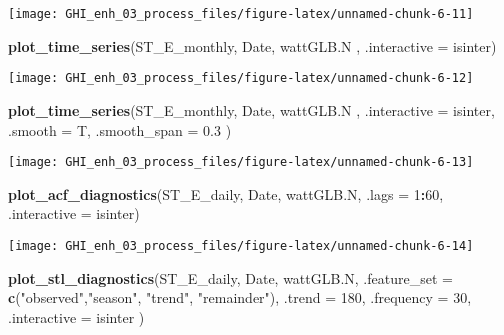 \documentclass[
  10pt,
  a4paper,oneside]{article}
\newenvironment{Shaded}{\begin{snugshade}}{\end{snugshade}}
\newcommand{\AttributeTok}[1]{\textcolor[rgb]{0.13,0.29,0.53}{#1}}
\newcommand{\DecValTok}[1]{\textcolor[rgb]{0.00,0.00,0.81}{#1}}
\newcommand{\FloatTok}[1]{\textcolor[rgb]{0.00,0.00,0.81}{#1}}
\newcommand{\FunctionTok}[1]{\textcolor[rgb]{0.13,0.29,0.53}{\textbf{#1}}}
\newcommand{\NormalTok}[1]{#1}
\newcommand{\SpecialCharTok}[1]{\textcolor[rgb]{0.81,0.36,0.00}{\textbf{#1}}}
\newcommand{\StringTok}[1]{\textcolor[rgb]{0.31,0.60,0.02}{#1}}
\begin{document}
\begin{center}\texttt{[image: GHI\_enh\_03\_process\_files/figure-latex/unnamed-chunk-6-11]} \end{center}

\begin{Shaded}
\begin{Highlighting}[]
\FunctionTok{plot\_time\_series}\NormalTok{(ST\_E\_monthly, Date, wattGLB.N   , }\AttributeTok{.interactive =}\NormalTok{ isinter)}
\end{Highlighting}
\end{Shaded}

\begin{center}\texttt{[image: GHI\_enh\_03\_process\_files/figure-latex/unnamed-chunk-6-12]} \end{center}

\begin{Shaded}
\begin{Highlighting}[]
\FunctionTok{plot\_time\_series}\NormalTok{(ST\_E\_monthly, Date, wattGLB.N   , }\AttributeTok{.interactive =}\NormalTok{ isinter, }\AttributeTok{.smooth =}\NormalTok{ T, }\AttributeTok{.smooth\_span =} \FloatTok{0.3}\NormalTok{ )}
\end{Highlighting}
\end{Shaded}

\begin{center}\texttt{[image: GHI\_enh\_03\_process\_files/figure-latex/unnamed-chunk-6-13]} \end{center}

\begin{Shaded}
\begin{Highlighting}[]
\FunctionTok{plot\_acf\_diagnostics}\NormalTok{(ST\_E\_daily, Date, wattGLB.N, }\AttributeTok{.lags =} \DecValTok{1}\SpecialCharTok{:}\DecValTok{60}\NormalTok{, }\AttributeTok{.interactive =}\NormalTok{ isinter)}
\end{Highlighting}
\end{Shaded}

\begin{center}\texttt{[image: GHI\_enh\_03\_process\_files/figure-latex/unnamed-chunk-6-14]} \end{center}

\begin{Shaded}
\begin{Highlighting}[]
\FunctionTok{plot\_stl\_diagnostics}\NormalTok{(ST\_E\_daily, Date, wattGLB.N,}
                     \AttributeTok{.feature\_set =} \FunctionTok{c}\NormalTok{(}\StringTok{"observed"}\NormalTok{,}\StringTok{"season"}\NormalTok{, }\StringTok{"trend"}\NormalTok{, }\StringTok{"remainder"}\NormalTok{),}
                     \AttributeTok{.trend =} \DecValTok{180}\NormalTok{,}
                     \AttributeTok{.frequency =} \DecValTok{30}\NormalTok{,}
                     \AttributeTok{.interactive =}\NormalTok{ isinter}
\NormalTok{                     )}
\end{Highlighting}
\end{Shaded}
\end{document}
